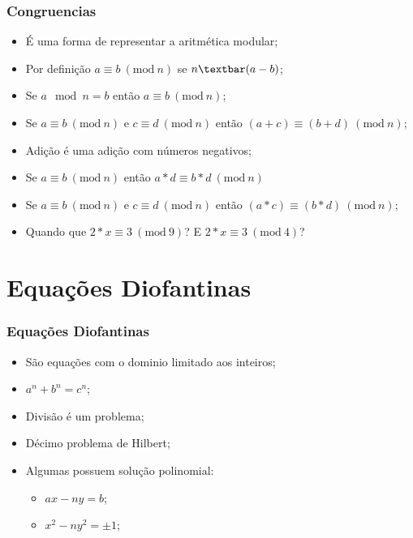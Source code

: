 \documentclass{beamer}
\newcommand{\Mod}[1]{\ (\text{mod}\ #1)}
\begin{document}
\begin{frame}
    \frametitle{Congruencias}

    \begin{itemize}
        \item É uma forma de representar a aritmética modular;
        \item Por definição $a \equiv b \Mod{n}$ se $n \textbar (a - b)$;
        \item Se $a \mod n = b$ então $a \equiv b \Mod{n}$;
        \item Se $a \equiv b \Mod{n}$ e $c \equiv d \Mod{n}$ então $(a + c) \equiv (b + d) \Mod{n}$;
        \item Adição é uma adição com números negativos;
        \item Se $a \equiv b \Mod{n}$ então $a*d \equiv b*d \Mod{n}$
        \item Se $a \equiv b \Mod{n}$ e $c \equiv d \Mod{n}$ então $(a * c) \equiv (b * d) \Mod{n}$;
        \item Quando que $2*x \equiv 3 \Mod{9}$? E $2*x \equiv 3 \Mod{4}$?
    \end{itemize}
\end{frame}

\section{Equações Diofantinas}
\begin{frame}
    \frametitle{Equações Diofantinas}

    \begin{itemize}
        \item São equações com o dominio limitado aos inteiros;
        \item $a^n + b^n = c^n$;
        \item Divisão é um problema;
        \item Décimo problema de Hilbert;
        \item Algumas possuem solução polinomial:
            \begin{itemize}
                \item $ax - ny = b$;
                \item $x^2 - ny^2 = \pm 1$;
            \end{itemize}
    \end{itemize}
\end{frame}
\end{document}
